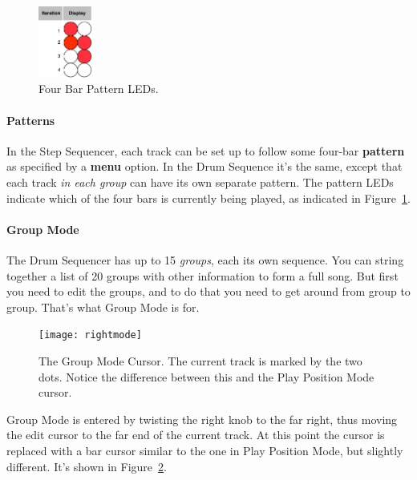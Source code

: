\documentclass{article}
\begin{document}
\begin{figure}
\hspace{\fill}\includegraphics[width=0.7in]{Patterns}\hspace{\fill}

\caption{\small Four Bar Pattern LEDs.}\vspace{-2em}
\label{bars2}
\end{figure}

\paragraph{Patterns}

In the Step Sequencer, each track can be set up to follow some four-bar {\bf pattern} as specified by a {\bf menu} option.  In the Drum Sequence it's the same, except that each track {\it in each group} can have its own separate pattern.   The pattern LEDs indicate which of the four bars is currently being played, as indicated in Figure~\ref{bars2}.


\paragraph{Group Mode}  The Drum Sequencer has up to 15 {\it groups}, each its own sequence.  You can string together a list of 20 groups with other information to form a full song.  But first you need to edit the groups, and to do that you need to get around from group to group.  That's what Group Mode is for.

\begin{figure}
\hspace{\fill}\texttt{[image: rightmode]}\hspace{\fill}

\caption{\small The Group Mode Cursor.  The current track is marked by the two dots.  Notice the difference between this and the Play Position Mode cursor.}

\label{groupmode}
\end{figure}

Group Mode is entered by twisting the right knob to the far right, thus moving the edit cursor to the far end of the current track.  At this point the cursor is replaced with a bar cursor similar to the one in Play Position Mode, but slightly different.  It's shown in Figure~\ref{groupmode}.
\end{document}
